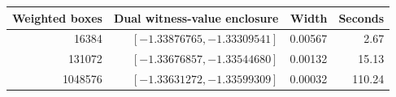 \begin{tabular}{r r r r}
\toprule
Weighted boxes & Dual witness-value enclosure & Width & Seconds \\
\midrule
16384 & $[-1.33876765,-1.33309541]$ & 0.00567 & 2.67 \\
131072 & $[-1.33676857,-1.33544680]$ & 0.00132 & 15.13 \\
1048576 & $[-1.33631272,-1.33599309]$ & 0.00032 & 110.24 \\
\bottomrule
\end{tabular}
